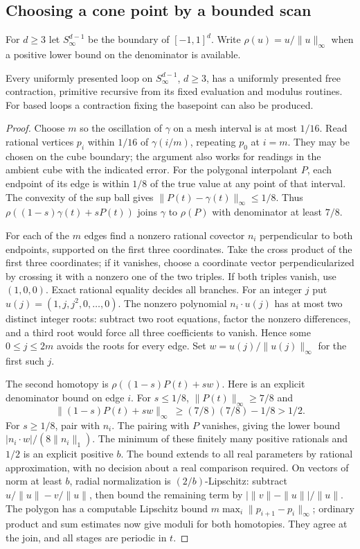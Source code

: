 \subsection{Choosing a cone point by a bounded scan}
For $d\ge3$ let $S_\infty^{d-1}$ be the boundary of $[-1,1]^d$. Write $\rho(u)=u/\|u\|_\infty$ when a positive lower bound on the denominator is available.
\begin{theorem}\label{thm:loopSphere}\label{idx-surfaces22}
Every uniformly presented loop on $S_\infty^{d-1}$, $d\ge3$, has a uniformly presented free contraction, primitive recursive from its fixed evaluation and modulus routines. For based loops a contraction fixing the basepoint can also be produced.
\end{theorem}
\begin{proof}
Choose $m$ so the oscillation of $\gamma$ on a mesh interval is at most $1/16$. Read rational vertices $p_i$ within $1/16$ of $\gamma(i/m)$, repeating $p_0$ at $i=m$. They may be chosen on the cube boundary; the argument also works for readings in the ambient cube with the indicated error. For the polygonal interpolant $P$, each endpoint of its edge is within $1/8$ of the true value at any point of that interval. The convexity of the sup ball gives $\|P(t)-\gamma(t)\|_\infty\le1/8$. Thus $\rho((1-s)\gamma(t)+sP(t))$ joins $\gamma$ to $\rho(P)$ with denominator at least $7/8$.

For each of the $m$ edges find a nonzero rational covector $n_i$ perpendicular to both endpoints, supported on the first three coordinates. Take the cross product of the first three coordinates; if it vanishes, choose a coordinate vector perpendicularized by crossing it with a nonzero one of the two triples. If both triples vanish, use $(1,0,0)$. Exact rational equality decides all branches. For an integer $j$ put $u(j)=(1,j,j^2,0,\dots,0)$. The nonzero polynomial $n_i\cdot u(j)$ has at most two distinct integer roots: subtract two root equations, factor the nonzero differences, and a third root would force all three coefficients to vanish. Hence some $0\le j\le 2m$ avoids the roots for every edge. Set $w=u(j)/\|u(j)\|_\infty$ for the first such $j$.

The second homotopy is $\rho((1-s)P(t)+sw)$. Here is an explicit denominator bound on edge $i$. For $s\le1/8$, $\|P(t)\|_\infty\ge7/8$ and
\[
 \|(1-s)P(t)+sw\|_\infty\ \ge (7/8)(7/8)-1/8>1/2.
\]
For $s\ge1/8$, pair with $n_i$. The pairing with $P$ vanishes, giving the lower bound $|n_i\cdot w|/(8\|n_i\|_1)$. The minimum of these finitely many positive rationals and $1/2$ is an explicit positive $b$. The bound extends to all real parameters by rational approximation, with no decision about a real comparison required. On vectors of norm at least $b$, radial normalization is $(2/b)$-Lipschitz: subtract $u/\|u\|-v/\|u\|$, then bound the remaining term by $|\|v\|-\|u\||/\|u\|$. The polygon has a computable Lipschitz bound $m\max_i\|p_{i+1}-p_i\|_\infty$; ordinary product and sum estimates now give moduli for both homotopies. They agree at the join, and all stages are periodic in $t$.


\end{proof}
